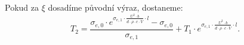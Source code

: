 \documentclass{article}
\begin{document}
Pokud za $\xi$ dosadíme původní výraz, dostaneme:
$$
    T_2 = \frac{\sigma_{e,0} \cdot e^{\sigma_{e,1} \cdot \frac{U^2 \cdot b}{d \cdot \rho \cdot c \cdot \dot{V}} \cdot l} - \sigma_{e,0}}{\sigma_{e,1}} + T_1 \cdot e^{\sigma_{e,1} \cdot \frac{U^2 \cdot b}{d \cdot \rho \cdot c \cdot \dot{V}} \cdot l}.
$$
\end{document}
